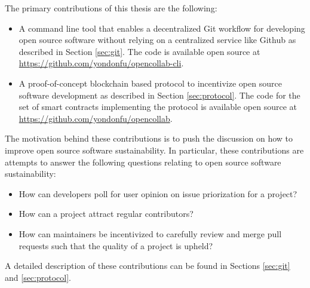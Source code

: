 The primary contributions of this thesis are the following:

\begin{itemize}
  \item A command line tool that enables a decentralized Git workflow for
    developing open source software without relying on a centralized service
    like Github as described in Section \ref{sec:git}. The code is available
    open source at \url{https://github.com/yondonfu/opencollab-cli}.
  \item A proof-of-concept blockchain based protocol to incentivize open source
    software development as described in Section \ref{sec:protocol}. The code
    for the set of smart contracts implementing the protocol is available open source at \url{https://github.com/yondonfu/opencollab}.
\end{itemize}

The motivation behind these contributions is to push the discussion on how to
improve open source software sustainability. In particular, these contributions are
attempts to answer the following questions relating to open source software sustainability:

\begin{itemize}
  \item How can developers poll for user opinion on issue
    priorization for a project?
  \item How can a project attract regular contributors?
  \item How can maintainers be incentivized to carefully review and merge pull
    requests such that the quality of a project is upheld?
 \end{itemize}

A detailed description of these contributions can be found in Sections
\ref{sec:git} and \ref{sec:protocol}.

